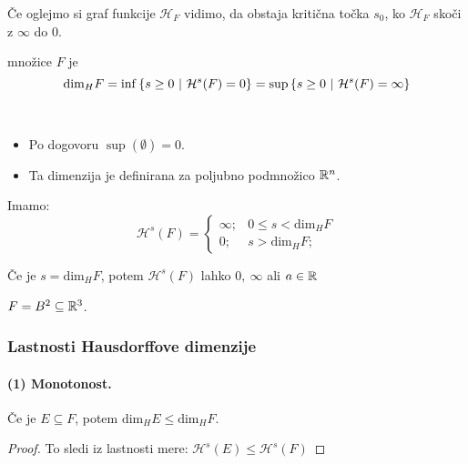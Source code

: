 Če oglejmo si graf funkcije \(\mathcal{H}_F\) vidimo, da obstaja kritična točka \(s_0\), ko \(\mathcal{H}_F\) skoči z \(\infty\) do \(0\).

\begin{definicija}
     množice \(F\) je 
    \[\text{dim}_H F = \inf \left\{s \geq 0 \ | \ \mathcal{H}^{s}(F) = 0\right\} = \sup \left\{s \geq 0 \ | \ \mathcal{H}^{s}(F) = \infty\right\}\]
\end{definicija}

\begin{opomba} \
    \begin{itemize}
        \item Po dogovoru \(\sup (\emptyset) = 0\).
        \item Ta dimenzija je definirana za poljubno podmnožico \(\mathbb{R}^n\).
    \end{itemize}    
\end{opomba}

Imamo:
\[
    \mathcal{H}^{s}(F) = \begin{cases}
        \infty; &0 \leq s < \text{dim}_H F \\ 
        0; &s > \text{dim}_H F;
    \end{cases}
\]

Če je \(s = \text{dim}_H F\), potem \(\mathcal{H}^{s}(F)\) lahko \(0, \  \infty\) ali \(a \in \mathbb{R}\)

\begin{primer}
    \(F = B^2 \subseteq \mathbb{R}^3\). \todo{}
\end{primer}

\newpage
\subsubsection*{Lastnosti Hausdorffove dimenzije}
\paragraph{(1) Monotonost.} Če je \(E \subseteq F\), potem \(\text{dim}_H E \leq \text{dim}_H F\).
\begin{proof}
    To sledi iz lastnosti mere: \(\mathcal{H}^{s}(E) \leq \mathcal{H}^{s}(F)\)
\end{proof}

